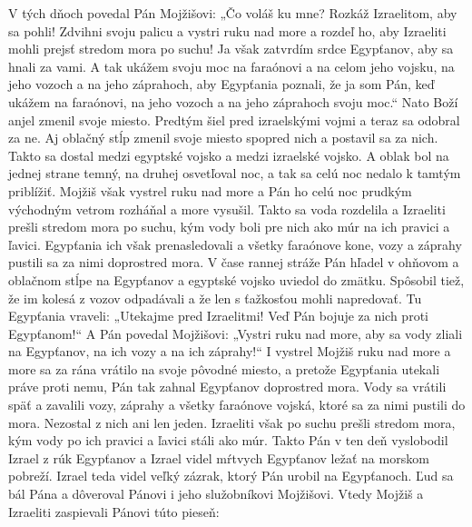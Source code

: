 V tých dňoch povedal Pán Mojžišovi: „Čo voláš ku mne? Rozkáž Izraelitom, aby sa pohli! Zdvihni svoju palicu a vystri ruku nad more a rozdeľ ho, aby Izraeliti mohli prejsť stredom mora po suchu! Ja však zatvrdím srdce Egypťanov, aby sa hnali za vami. A tak ukážem svoju moc na faraónovi a na celom jeho vojsku, na jeho vozoch a na jeho záprahoch, aby Egypťania poznali, že ja som Pán, keď ukážem na faraónovi, na jeho vozoch a na jeho záprahoch svoju moc.“ 
\versseparator
Nato Boží anjel zmenil svoje miesto. Predtým šiel pred izraelskými vojmi a teraz sa odobral za ne. Aj oblačný stĺp zmenil svoje miesto spopred nich a postavil sa za nich. Takto sa dostal medzi egyptské vojsko a medzi izraelské vojsko. A oblak bol na jednej strane temný, na druhej osvetľoval noc, a tak sa celú noc nedalo k tamtým priblížiť.
\versseparator
Mojžiš však vystrel ruku nad more a Pán ho celú noc prudkým východným vetrom rozháňal a more vysušil. Takto sa voda rozdelila a Izraeliti prešli stredom mora po suchu, kým vody boli pre nich ako múr na ich pravici a ľavici.
Egypťania ich však prenasledovali a všetky faraónove kone, vozy a záprahy pustili sa za nimi doprostred mora. 
\versseparator
V čase rannej stráže Pán hľadel v ohňovom a oblačnom stĺpe na Egypťanov a egyptské vojsko uviedol do zmätku. Spôsobil tiež, že im kolesá z vozov odpadávali a že len s ťažkosťou mohli napredovať. Tu Egypťania vraveli: „Utekajme pred Izraelitmi! Veď Pán bojuje za nich proti Egypťanom!“ 
\versseparator
A Pán povedal Mojžišovi: „Vystri ruku nad more, aby sa vody zliali na Egypťanov, na ich vozy a na ich záprahy!“ I vystrel Mojžiš ruku nad more a more sa za rána vrátilo na svoje pôvodné miesto, a pretože Egypťania utekali práve proti nemu, Pán tak zahnal Egypťanov doprostred mora. Vody sa vrátili späť a zavalili vozy, záprahy a všetky faraónove vojská, ktoré sa za nimi pustili do mora. Nezostal z nich ani len jeden. Izraeliti však po suchu prešli stredom mora, kým vody po ich pravici a ľavici stáli ako múr.
\versseparator
Takto Pán v ten deň vyslobodil Izrael z rúk Egypťanov a Izrael videl mŕtvych Egypťanov ležať na morskom pobreží. Izrael teda videl veľký zázrak, ktorý Pán urobil na Egypťanoch. Ľud sa bál Pána a dôveroval Pánovi i jeho služobníkovi Mojžišovi.
\versseparator
Vtedy Mojžiš a Izraeliti zaspievali Pánovi túto pieseň: 